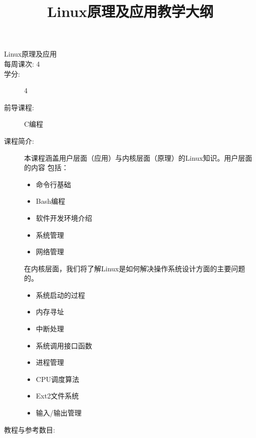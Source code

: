 \documentclass{wx672article} %
\title{Linux原理及应用教学大纲}
\author{}\date{}
\begin{document}

\begin{description}
\item[Linux原理及应用]
\item[每周课次: 4]
\item[学分:] 4
\item[前导课程:] C编程
\item[课程简介:] 本课程涵盖用户层面（应用）与内核层面（原理）的Linux知识。用户层面的内容
  包括：
  \begin{itemize}
  \item 命令行基础
  \item Bash编程
  \item 软件开发环境介绍
  \item 系统管理
  \item 网络管理
  \end{itemize}
  在内核层面，我们将了解Linux是如何解决操作系统设计方面的主要问题的。
  \begin{multicols}{2}
    \begin{itemize}
    \item 系统启动的过程
    \item 内存寻址
    \item 中断处理
    \item 系统调用接口函数
    \item 进程管理
    \item CPU调度算法
    \item Ext2文件系统
    \item 输入/输出管理
    \end{itemize}
  \end{multicols}
  \item[教程与参考数目:]\hfill
  \nocite{cooper10bash,web:debianhandbook,web:debkernelhandbook,bovet2005understanding,tanenbaum2008modern,bovet2005understanding}
  \printbibliography[heading=none]{}
\end{description}
\end{document}
